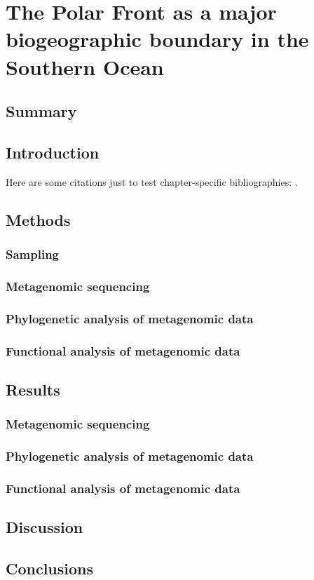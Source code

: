 \chapter{The Polar Front as a major biogeographic boundary in the Southern Ocean} 
\label{ch:polarfront}

\section{Summary}

\section{Introduction}

Here are some citations just to test chapter-specific bibliographies: \cite{Lauro:2010jna,Anonymous:2009hd,Anonymous:2010fi}.

\section{Methods}
\subsection{Sampling}
\subsection{Metagenomic sequencing}
\subsection{Phylogenetic analysis of metagenomic data}
\subsection{Functional analysis of metagenomic data}

\section{Results}
\subsection{Metagenomic sequencing}
\subsection{Phylogenetic analysis of metagenomic data}
\subsection{Functional analysis of metagenomic data}

\section{Discussion}

\section{Conclusions}
